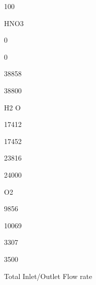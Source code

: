\documentclass[a4paper,portrait,12pt]{article}
\begin{document}
100





\begin{flushleft}
HNO3
\end{flushleft}





0





0





38858





38800





\begin{flushleft}
H2 O
\end{flushleft}





17412





17452





23816





24000





\begin{flushleft}
O2
\end{flushleft}





9856





10069





3307





3500





\begin{flushleft}
Total Inlet/Outlet Flow rate
\end{flushleft}
\end{document}
